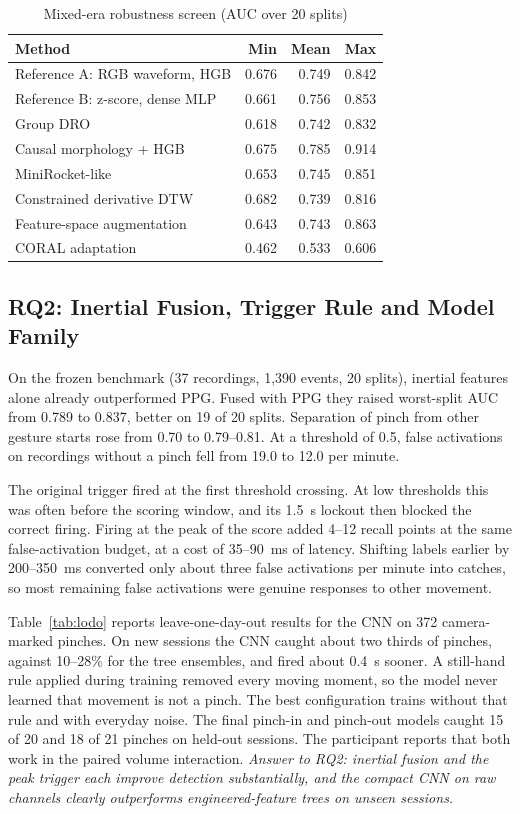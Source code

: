 \begin{table}[t]
  \centering
  \caption{Mixed-era robustness screen (AUC over 20 splits)}
  \label{tab:mixed}
  \small
  \begin{tabular}{@{}lrrr@{}}
    \toprule
    Method & Min & Mean & Max \\
    \midrule
    Reference A: RGB waveform, HGB & 0.676 & 0.749 & 0.842 \\
    Reference B: z-score, dense MLP & 0.661 & 0.756 & 0.853 \\
    Group DRO~\cite{sagawa2019dro} & 0.618 & 0.742 & 0.832 \\
    Causal morphology + HGB & 0.675 & 0.785 & 0.914 \\
    MiniRocket-like~\cite{dempster2020minirocket} & 0.653 & 0.745 & 0.851 \\
    Constrained derivative DTW & 0.682 & 0.739 & 0.816 \\
    Feature-space augmentation & 0.643 & 0.743 & 0.863 \\
    CORAL adaptation~\cite{sun2016coral} & 0.462 & 0.533 & 0.606 \\
    \bottomrule
  \end{tabular}
\end{table}

\subsection{RQ2: Inertial Fusion, Trigger Rule and Model Family}

On the frozen benchmark (37 recordings, 1{,}390 events, 20 splits), inertial features alone already outperformed PPG. Fused with PPG they raised worst-split AUC from 0.789 to 0.837, better on 19 of 20 splits. Separation of pinch from other gesture starts rose from 0.70 to 0.79--0.81. At a threshold of 0.5, false activations on recordings without a pinch fell from 19.0 to 12.0 per minute.

The original trigger fired at the first threshold crossing. At low thresholds this was often before the scoring window, and its 1.5~s lockout then blocked the correct firing. Firing at the peak of the score added 4--12 recall points at the same false-activation budget, at a cost of 35--90~ms of latency. Shifting labels earlier by 200--350~ms converted only about three false activations per minute into catches, so most remaining false activations were genuine responses to other movement.

Table~\ref{tab:lodo} reports leave-one-day-out results for the CNN on 372 camera-marked pinches. On new sessions the CNN caught about two thirds of pinches, against 10--28\% for the tree ensembles, and fired about 0.4~s sooner. A still-hand rule applied during training removed every moving moment, so the model never learned that movement is not a pinch. The best configuration trains without that rule and with everyday noise. The final pinch-in and pinch-out models caught 15 of 20 and 18 of 21 pinches on held-out sessions. The participant reports that both work in the paired volume interaction. \emph{Answer to RQ2: inertial fusion and the peak trigger each improve detection substantially, and the compact CNN on raw channels clearly outperforms engineered-feature trees on unseen sessions.}

